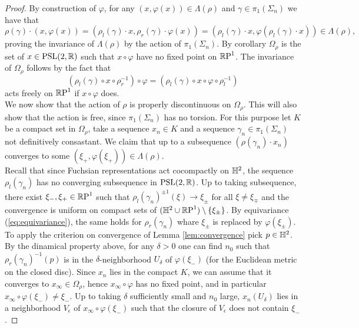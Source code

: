 \begin{proof}
    By construction of $\varphi$, for any $(x, \varphi(x)) \in \Lambda(\rho)$ and $\gamma \in \pi_1(\Sigma_n)$ we have that 
    \[
        \rho(\gamma) \cdot(x,\varphi(x)) = (\rho_l(\gamma) \cdot x, \rho_r(\gamma) \cdot \varphi(x)) = (\rho_l(\gamma) \cdot x,  \varphi(\rho_l(\gamma)\cdot x)) \in \Lambda(\rho), 
    \]
    proving the invariance of $\Lambda(\rho)$ by the action of $\pi_1(\Sigma_n)$. By corollary  $\Omega_\rho$ is the set of $x \in \PSL$ such that $x\circ \varphi$ have no fixed point on $\S$. The invariance of $\Omega_\rho$ follows by the fact that
    \[
        (\rho_l(\gamma) \circ x \circ \rho_r^{-1} ) \circ \varphi = (\rho_l(\gamma) \circ x \circ \varphi \circ \rho_l^{-1})
    \]
    acts freely on $\S$ if $x \circ \varphi$  does.\\
    We now show that the action of $\rho$ is properly discontinuous on $\Omega_\rho$. This will also show that the action is free, since $\pi_1(\Sigma_n)$ has no torsion.
    For this purpose let $K$ be a compact set in $\Omega_\rho$, take a sequence $x_n \in K$ and a sequence $\gamma_n \in \pi_1(\Sigma_n)$ not definitively consastant. We claim that up to a subsequence $(\rho(\gamma_n)\cdot x_n)$ converges to some $(\xi_+, \varphi(\xi_+)) \in \Lambda(\rho)$.\\
    Recall that since Fuchsian representations act cocompactly on $\H^2$, the sequence $\rho_l(\gamma_n)$ has no converging subsequence in $\PSL$. Up to taking subsequence, there exist $\xi_-,\xi_+ \in \S$ such that $\rho_l(\gamma_n)^{\pm 1}(\xi) \to \xi_\pm$ for all $\xi \neq \xi_\mp$ and the convergence is uniform on compact sets of $(\H^2 \cup \S) \setminus \{\xi_\pm \}$. By equivariance (\ref{eq:equivariance}), the same holds for $\rho_r(\gamma_n)$ whare $\xi_\pm$ is replaced by $\varphi (\xi_\pm)$.\\
    To apply the criterion on convergence of Lemma \ref{lem:convergence} pick $p\in \H^2$. By the dinamical property above, for any $\delta >0$ one can find $n_0$ such that $\rho_r(\gamma_n)^{-1}(p)$ is in the $\delta$-neighborhood $U_\delta$ of $\varphi(\xi_-)$ (for the Euclidean metric on the closed disc).
    Since $x_n$ lies in the compact $K$, we can assume that it converges to $x_\infty \in \Omega_\rho$, hence $x_\infty \circ \varphi$ has no fixed point, and in particular $x_\infty \circ \varphi(\xi_-) \neq \xi_-$.
    Up to taking $\delta$ sufficiently small and $n_0$ large, $x_n(U_\delta)$ lies in a neighborhood $V_\epsilon$ of $x_\infty \circ \varphi(\xi_-)$ such that the closure of $V_\epsilon$ does not contain $\xi_-$.

\end{proof}
